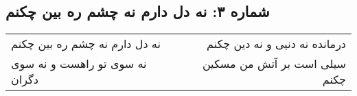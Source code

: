 \begin{center}
\section*{شماره ۳: نه دل دارم نه چشم ره بین چکنم}
\label{sec:003}
\begin{longtable}{l p{0.5cm} r}
نه دل دارم نه چشم ره بین چکنم
&&
درمانده نه دنیی و نه دین چکنم
\\
نه سوی تو راهست و نه سوی دگران
&&
سیلی است بر آتش من مسکین چکنم
\\
\end{longtable}
\end{center}
